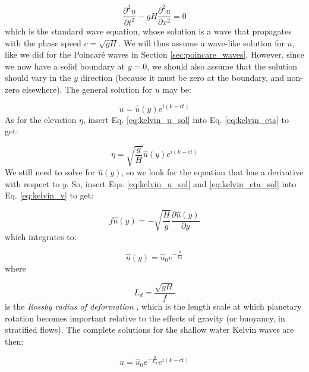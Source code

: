 \documentclass[12pt]{article}
\numberwithin{equation}{section}
\numberwithin{figure}{section}
\numberwithin{table}{section}
\begin{document}
\begin{equation}
  \frac{\partial^2 u}{\partial t^2} - gH \frac{\partial^2 u}{\partial x^2} = 0
\end{equation}
which is the standard wave equation, whose solution is a wave that propagates
with the phase speed $c = \sqrt{gH}$.
We will thus assume a wave-like solution for $u$, like we did for the Poincaré
waves in Section \ref{sec:poincare_waves}.
However, since we now have a solid boundary at $y = 0$, we should also assume
that the solution should vary in the $y$ direction (because it must be zero
at the boundary, and non-zero elsewhere).
The general solution for $u$ may be:

\begin{equation}
  u = \widehat{u}(y) e^{i(k - c t)}
  \label{eq:kelvin_u_sol}
\end{equation}
As for the elevation $\eta$, insert Eq. \ref{eq:kelvin_u_sol} into Eq.
\ref{eq:kelvin_eta} to get:

\begin{equation}
  \eta = \sqrt{\frac{g}{H}} \widehat{u}(y) e^{i(k - c t)}
  \label{eq:kelvin_eta_sol}
\end{equation}
We still need to solve for $\widehat{u}(y)$, so we look for the equation that
has a derivative with respect to $y$.
So, insert Eqs. \ref{eq:kelvin_u_sol} and \ref{eq:kelvin_eta_sol} into Eq.
\ref{eq:kelvin_v} to get:

\begin{equation}
  f \widehat{u}(y) = - \sqrt{\frac{H}{g}} \frac{\partial \widehat{u}(y)}{\partial y}
\end{equation}
which integrates to:

\begin{equation}
  \widehat{u}(y) = \widehat{u}_0 e^{-\frac{y}{L_d}}
  \label{eq:kelvin_u_sol_y}
\end{equation}
where

\begin{equation}
  L_d = \frac{\sqrt{gH}}{f}
  \label{eq:rossby_deformation_radius}
\end{equation}
is the \textit{Rossby radius of deformation}
,
which is the length scale at which planetary rotation becomes important
relative to the effects of gravity (or buoyancy, in stratified flows).
The complete solutions for the shallow water Kelvin waves are then:

\begin{equation}
  u = \widehat{u}_0 e^{-\frac{y}{L_d}} e^{i(k - c t)}
\end{equation}
\end{document}

